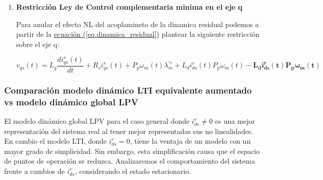 \documentclass{article}
\begin{document}
\begin{enumerate}[label=\roman*.]

    \item \textbf{Restricción Ley de Control complementaria minima en el eje q}
    
    Para anular el efecto NL del acoplamineto de la dinamica residual podemos a partir de la
    \hyperref[eq.dinamica_residual]{ecuación (\ref*{eq.dinamica_residual})}
    plantear la siguiente restricción sobre el eje q:

    \begin{equation}
        v_{qs}(t) = L_{q}\frac{di_{qs}^r(t)}{dt} + R_{s}i_{qs}^r(t) + P_{p}\omega_{m}(t)\lambda_{m}^{\prime r} + L_{d}i_{ds}^r(t)P_{p}\omega_{m}(t) - \mathbf{L_{d}i_{ds}^r(t)P_{p}\omega_{m}(t)}
    \end{equation}


\end{enumerate}


\subsubsection{Comparación modelo dinámico LTI equivalente aumentado vs modelo dinámico global LPV}

El modelo dinámico global LPV para el caso general donde $i_{ds}^r \neq 0$
es una mejor representación del sistema real al tener mejor representadas sus 
no linealidades.
En cambio el modelo LTI, donde $i_{ds}^r = 0$, tiene la ventaja de un modelo 
con un mayor grado de simplicidad. Sin embargo, esta simplificación  causa que 
el espacio de puntos de operación se reduzca.
Analizaremos el comportamiento del sistema frente a cambios de $i_{ds}^r$, 
considerando el estado estacionario. 
\end{document}
